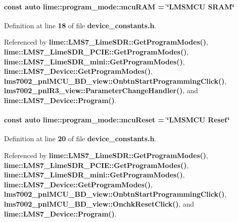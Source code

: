 \paragraph[{mcu\+R\+AM}]{\setlength{\rightskip}{0pt plus 5cm}const auto lime\+::program\+\_\+mode\+::mcu\+R\+AM = \char`\"{}L\+M\+S\+M\+CU S\+R\+AM\char`\"{}}\label{namespacelime_1_1program__mode_ab1b8ee6c05704b4cc237f1e42ec0880c}


Definition at line {\bf 18} of file {\bf device\+\_\+constants.\+h}.



Referenced by {\bf lime\+::\+L\+M\+S7\+\_\+\+Lime\+S\+D\+R\+::\+Get\+Program\+Modes()}, {\bf lime\+::\+L\+M\+S7\+\_\+\+Lime\+S\+D\+R\+\_\+\+P\+C\+I\+E\+::\+Get\+Program\+Modes()}, {\bf lime\+::\+L\+M\+S7\+\_\+\+Lime\+S\+D\+R\+\_\+mini\+::\+Get\+Program\+Modes()}, {\bf lime\+::\+L\+M\+S7\+\_\+\+Device\+::\+Get\+Program\+Modes()}, {\bf lms7002\+\_\+pnl\+M\+C\+U\+\_\+\+B\+D\+\_\+view\+::\+Onbtn\+Start\+Programming\+Click()}, {\bf lms7002\+\_\+pnl\+R3\+\_\+view\+::\+Parameter\+Change\+Handler()}, and {\bf lime\+::\+L\+M\+S7\+\_\+\+Device\+::\+Program()}.

\paragraph[{mcu\+Reset}]{\setlength{\rightskip}{0pt plus 5cm}const auto lime\+::program\+\_\+mode\+::mcu\+Reset = \char`\"{}L\+M\+S\+M\+CU Reset\char`\"{}}\label{namespacelime_1_1program__mode_aaa4bbfbe1b44ea4ee20dd24e98c8cbc3}


Definition at line {\bf 20} of file {\bf device\+\_\+constants.\+h}.



Referenced by {\bf lime\+::\+L\+M\+S7\+\_\+\+Lime\+S\+D\+R\+::\+Get\+Program\+Modes()}, {\bf lime\+::\+L\+M\+S7\+\_\+\+Lime\+S\+D\+R\+\_\+\+P\+C\+I\+E\+::\+Get\+Program\+Modes()}, {\bf lime\+::\+L\+M\+S7\+\_\+\+Lime\+S\+D\+R\+\_\+mini\+::\+Get\+Program\+Modes()}, {\bf lime\+::\+L\+M\+S7\+\_\+\+Device\+::\+Get\+Program\+Modes()}, {\bf lms7002\+\_\+pnl\+M\+C\+U\+\_\+\+B\+D\+\_\+view\+::\+Onbtn\+Start\+Programming\+Click()}, {\bf lms7002\+\_\+pnl\+M\+C\+U\+\_\+\+B\+D\+\_\+view\+::\+Onchk\+Reset\+Click()}, and {\bf lime\+::\+L\+M\+S7\+\_\+\+Device\+::\+Program()}.

